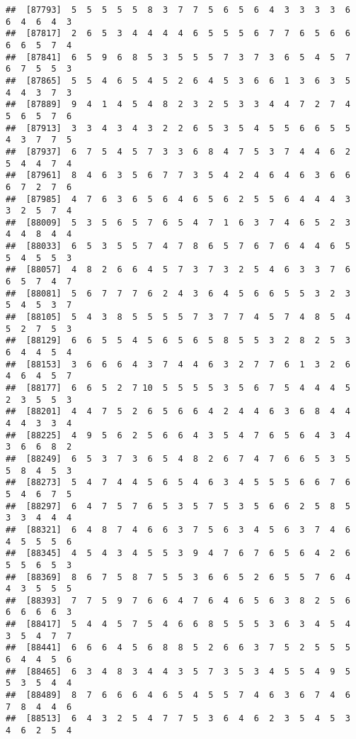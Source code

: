 \documentclass[
]{book}
\begin{document}
\begin{verbatim}
##  [87793]  5  5  5  5  5  8  3  7  7  5  6  5  6  4  3  3  3  3  6  6  4  6  4  3
##  [87817]  2  6  5  3  4  4  4  4  6  5  5  5  6  7  7  6  5  6  6  6  6  5  7  4
##  [87841]  6  5  9  6  8  5  3  5  5  5  7  3  7  3  6  5  4  5  7  6  7  5  5  3
##  [87865]  5  5  4  6  5  4  5  2  6  4  5  3  6  6  1  3  6  3  5  4  4  3  7  3
##  [87889]  9  4  1  4  5  4  8  2  3  2  5  3  3  4  4  7  2  7  4  5  6  5  7  6
##  [87913]  3  3  4  3  4  3  2  2  6  5  3  5  4  5  5  6  6  5  5  4  3  7  7  5
##  [87937]  6  7  5  4  5  7  3  3  6  8  4  7  5  3  7  4  4  6  2  5  4  4  7  4
##  [87961]  8  4  6  3  5  6  7  7  3  5  4  2  4  6  4  6  3  6  6  6  7  2  7  6
##  [87985]  4  7  6  3  6  5  6  4  6  5  6  2  5  5  6  4  4  4  3  3  2  5  7  4
##  [88009]  5  3  5  6  5  7  6  5  4  7  1  6  3  7  4  6  5  2  3  4  4  8  4  4
##  [88033]  6  5  3  5  5  7  4  7  8  6  5  7  6  7  6  4  4  6  5  5  4  5  5  3
##  [88057]  4  8  2  6  6  4  5  7  3  7  3  2  5  4  6  3  3  7  6  6  5  7  4  7
##  [88081]  5  6  7  7  7  6  2  4  3  6  4  5  6  6  5  5  3  2  3  5  4  5  3  7
##  [88105]  5  4  3  8  5  5  5  5  7  3  7  7  4  5  7  4  8  5  4  5  2  7  5  3
##  [88129]  6  6  5  5  4  5  6  5  6  5  8  5  5  3  2  8  2  5  3  6  4  4  5  4
##  [88153]  3  6  6  6  4  3  7  4  4  6  3  2  7  7  6  1  3  2  6  4  6  4  5  7
##  [88177]  6  6  5  2  7 10  5  5  5  5  3  5  6  7  5  4  4  4  5  2  3  5  5  3
##  [88201]  4  4  7  5  2  6  5  6  6  4  2  4  4  6  3  6  8  4  4  4  4  3  3  4
##  [88225]  4  9  5  6  2  5  6  6  4  3  5  4  7  6  5  6  4  3  4  3  6  6  8  2
##  [88249]  6  5  3  7  3  6  5  4  8  2  6  7  4  7  6  6  5  3  5  5  8  4  5  3
##  [88273]  5  4  7  4  4  5  6  5  4  6  3  4  5  5  5  6  6  7  6  5  4  6  7  5
##  [88297]  6  4  7  5  7  6  5  3  5  7  5  3  5  6  6  2  5  8  5  3  3  4  4  4
##  [88321]  6  4  8  7  4  6  6  3  7  5  6  3  4  5  6  3  7  4  6  4  5  5  5  6
##  [88345]  4  5  4  3  4  5  5  3  9  4  7  6  7  6  5  6  4  2  6  5  5  6  5  3
##  [88369]  8  6  7  5  8  7  5  5  3  6  6  5  2  6  5  5  7  6  4  4  3  5  5  5
##  [88393]  7  7  5  9  7  6  6  4  7  6  4  6  5  6  3  8  2  5  6  6  6  6  6  3
##  [88417]  5  4  4  5  7  5  4  6  6  8  5  5  5  3  6  3  4  5  4  3  5  4  7  7
##  [88441]  6  6  6  4  5  6  8  8  5  2  6  6  3  7  5  2  5  5  5  6  4  4  5  6
##  [88465]  6  3  4  8  3  4  4  3  5  7  3  5  3  4  5  5  4  9  5  5  3  5  4  4
##  [88489]  8  7  6  6  6  4  6  5  4  5  5  7  4  6  3  6  7  4  6  7  8  4  4  6
##  [88513]  6  4  3  2  5  4  7  7  5  3  6  4  6  2  3  5  4  5  3  4  6  2  5  4

\end{verbatim}
\end{document}
